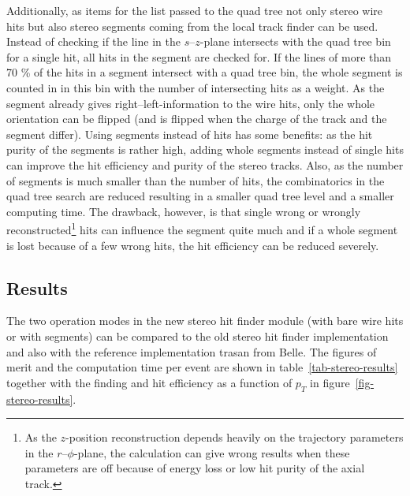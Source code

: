 Additionally, as items for the list passed to the quad tree not only stereo wire hits but also stereo segments coming from the local track finder can be used. Instead of checking if the line in the $s$--$z$-plane intersects with the quad tree bin for a single hit, all hits in the segment are checked for. If the lines of more than 70 \% of the hits in a segment intersect with a quad tree bin, the whole segment is counted in in this bin with the number of intersecting hits as a weight. As the segment already gives right--left-information to the wire hits, only the whole orientation can be flipped (and is flipped when the charge of the track and the segment differ). Using segments instead of hits has some benefits: as the hit purity of the segments is rather high, adding whole segments instead of single hits can improve the hit efficiency and purity of the stereo tracks. Also, as the number of segments is much smaller than the number of hits, the combinatorics in the quad tree search are reduced resulting in a smaller quad tree level and a smaller computing time. The drawback, however, is that single wrong or wrongly reconstructed\footnote{As the $z$-position reconstruction depends heavily on the trajectory parameters in the $r$--$\phi$-plane, the calculation can give wrong results when these parameters are off because of energy loss or low hit purity of the axial track.} hits can influence the segment quite much and if a whole segment is lost because of a few wrong hits, the hit efficiency can be reduced severely.

\subsection{Results}

The two operation modes in the new stereo hit finder module (with bare wire hits or with segments) can be compared to the old stereo hit finder implementation and also with the reference implementation trasan from Belle. The figures of merit and the computation time per event are shown in table~\ref{tab-stereo-results} together with the finding and hit efficiency as a function of $p_T$ in figure~\ref{fig-stereo-results}. 


